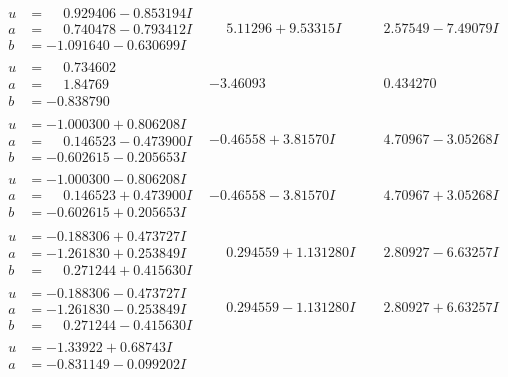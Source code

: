 \documentclass[1p]{elsarticle_modified}
\theoremstyle{definition}
\begin{document}
$$\begin{array}{c|c|c}
\begin{aligned}
u &= \phantom{-}0.929406 - 0.853194 I \\
a &= \phantom{-}0.740478 - 0.793412 I \\
b &= -1.091640 - 0.630699 I\end{aligned}
 & \phantom{-}5.11296 + 9.53315 I & \phantom{-}2.57549 - 7.49079 I \\ \hline\begin{aligned}
u &= \phantom{-}0.734602\phantom{ +0.000000I} \\
a &= \phantom{-}1.84769\phantom{ +0.000000I} \\
b &= -0.838790\phantom{ +0.000000I}\end{aligned}
 & -3.46093\phantom{ +0.000000I} & \phantom{-}0.434270\phantom{ +0.000000I} \\ \hline\begin{aligned}
u &= -1.000300 + 0.806208 I \\
a &= \phantom{-}0.146523 - 0.473900 I \\
b &= -0.602615 - 0.205653 I\end{aligned}
 & -0.46558 + 3.81570 I & \phantom{-}4.70967 - 3.05268 I \\ \hline\begin{aligned}
u &= -1.000300 - 0.806208 I \\
a &= \phantom{-}0.146523 + 0.473900 I \\
b &= -0.602615 + 0.205653 I\end{aligned}
 & -0.46558 - 3.81570 I & \phantom{-}4.70967 + 3.05268 I \\ \hline\begin{aligned}
u &= -0.188306 + 0.473727 I \\
a &= -1.261830 + 0.253849 I \\
b &= \phantom{-}0.271244 + 0.415630 I\end{aligned}
 & \phantom{-}0.294559 + 1.131280 I & \phantom{-}2.80927 - 6.63257 I \\ \hline\begin{aligned}
u &= -0.188306 - 0.473727 I \\
a &= -1.261830 - 0.253849 I \\
b &= \phantom{-}0.271244 - 0.415630 I\end{aligned}
 & \phantom{-}0.294559 - 1.131280 I & \phantom{-}2.80927 + 6.63257 I \\ \hline\begin{aligned}
u &= -1.33922 + 0.68743 I \\
a &= -0.831149 - 0.099202 I \\

\end{aligned}
\end{array}$$
\end{document}
